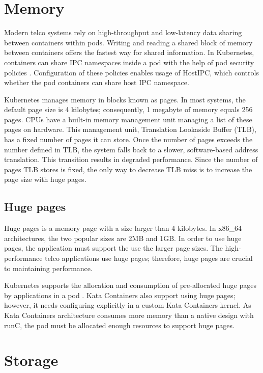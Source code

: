 \section{Memory}

Modern telco systems rely on high-throughput and low-latency data sharing between containers within pods. Writing and reading a shared block of memory between containers offers the fastest way for shared information. In Kubernetes, containers can share IPC namespaces inside a pod with the help of pod security policies \cite{PodSecurityPolicyKubernetes}. Configuration of these policies enables usage of HostIPC, which controls whether the pod containers can share host IPC namespace.

Kubernetes manages memory in blocks known as pages. In most systems, the default page size is 4 kilobytes; consequently, 1 megabyte of memory equals 256 pages. CPUs have a built-in memory management unit managing a list of these pages on hardware. This management unit, Translation Lookaside Buffer (TLB), has a fixed number of pages it can store. Once the number of pages exceeds the number defined in TLB, the system falls back to a slower, software-based address translation. This transition results in degraded performance. Since the number of pages TLB stores is fixed, the only way to decrease TLB miss is to increase the page size with huge pages. \cite{HugePagesOpenShift}

\subsection{Huge pages}

Huge pages is a memory page with a size larger than 4 kilobytes. In x86\_64 architectures, the two popular sizes are 2MB and 1GB. In order to use huge pages, the application must support the use the larger page sizes. The high-performance telco applications use huge pages; therefore, huge pages are crucial to maintaining performance.

Kubernetes supports the allocation and consumption of pre-allocated huge pages by applications in a pod \cite{HugePagesKubernetes}. Kata Containers also support using huge pages; however, it needs configuring explicitly in a custom Kata Containers kernel. As Kata Containers architecture consumes more memory than a native design with runC, the pod must be allocated enough resources to support huge pages.

\section{Storage}

